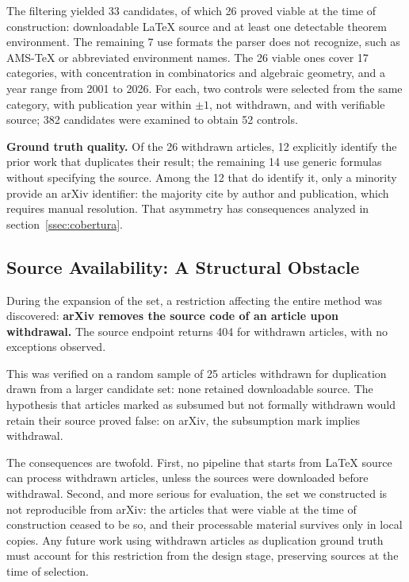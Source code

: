 \documentclass[12pt,a4paper]{article}
\theoremstyle{remark}
\begin{document}
The filtering yielded 33 candidates, of which 26 proved viable at the time of construction: downloadable LaTeX source and at least one detectable theorem environment. The remaining 7 use formats the parser does not recognize, such as AMS-\TeX{} or abbreviated environment names. The 26 viable ones cover 17 categories, with concentration in combinatorics and algebraic geometry, and a year range from 2001 to 2026. For each, two controls were selected from the same category, with publication year within $\pm 1$, not withdrawn, and with verifiable source; 382 candidates were examined to obtain 52 controls.

\textbf{Ground truth quality.} Of the 26 withdrawn articles, 12 explicitly identify the prior work that duplicates their result; the remaining 14 use generic formulas without specifying the source. Among the 12 that do identify it, only a minority provide an arXiv identifier: the majority cite by author and publication, which requires manual resolution. That asymmetry has consequences analyzed in section~\ref{ssec:cobertura}.

\subsection{Source Availability: A Structural Obstacle}
\label{ssec:fuentes}

During the expansion of the set, a restriction affecting the entire method was discovered: \textbf{arXiv removes the source code of an article upon withdrawal.} The source endpoint returns 404 for withdrawn articles, with no exceptions observed.

This was verified on a random sample of 25 articles withdrawn for duplication drawn from a larger candidate set: none retained downloadable source. The hypothesis that articles marked as subsumed but not formally withdrawn would retain their source proved false: on arXiv, the subsumption mark implies withdrawal.

The consequences are twofold. First, no pipeline that starts from LaTeX source can process withdrawn articles, unless the sources were downloaded before withdrawal. Second, and more serious for evaluation, the set we constructed is not reproducible from arXiv: the articles that were viable at the time of construction ceased to be so, and their processable material survives only in local copies. Any future work using withdrawn articles as duplication ground truth must account for this restriction from the design stage, preserving sources at the time of selection.
\end{document}
